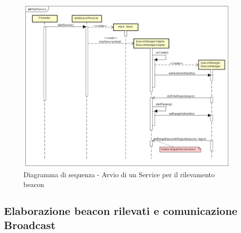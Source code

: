 \documentclass[../DefinizioneDiProdotto.tex]{subfiles}
\begin{document}
		\begin{figure}
			\includegraphics[width=\textwidth]{diagrams/StartService}
			\caption{Diagramma di sequenza - Avvio di un Service per il rilevamento beacon}
			\label{StartService}
		\end{figure}
		
	\subsection{Elaborazione beacon rilevati e comunicazione Broadcast}
		
		
\end{document}
